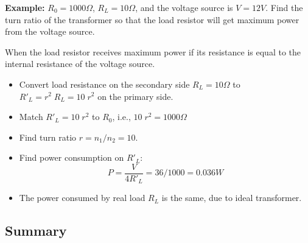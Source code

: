 {\bf Example:} $R_0=1000\Omega$, $R_L=10\Omega$, and the voltage 
source is $V=12V$. Find the turn ratio of the transformer so that 
the load resistor will get maximum power from the voltage source.

When the load resistor receives maximum power if its resistance 
is equal to the internal resistance of the voltage source. 
\begin{itemize}
\item Convert load resistance on the secondary side $R_L=10\Omega$ to 
	$R'_L=r^2\; R_L=10\; r^2$ on the primary side.
\item Match $R'_L=10\;r^2$ to $R_0$, i.e., $10\; r^2=1000\Omega$
\item Find turn ratio $r=n_1/n_2=10$.
\item Find power consumption on $R'_L$: 
	\[ P=\frac{V}{4R'_L}=36/1000=0.036W	\]
\item The power consumed by real load $R_L$ is the same, due to ideal 
transformer.
\end{itemize}


\subsection*{Summary}

